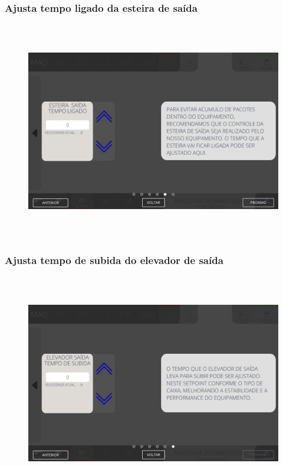 \newpage
\thispagestyle{fancy}
\vspace*{40 pt}
\subsubsection{\small{Ajusta tempo ligado da esteira de saída}}
\vspace*{\fill}
\begin{figure}[h]
  \centering
  \includegraphics[width=576px,height=360px]{src/imagesFlexo/08-count/settings/e-11.png}
\end{figure}
\vspace*{\fill}


\newpage
\thispagestyle{fancy}
\vspace*{40 pt}
\subsubsection{\small{Ajusta tempo de subida do elevador de saída}}
\vspace*{\fill}
\begin{figure}[h]
  \centering
  \includegraphics[width=576px,height=360px]{src/imagesFlexo/08-count/settings/e-12.png}
\end{figure}
\vspace*{\fill}

